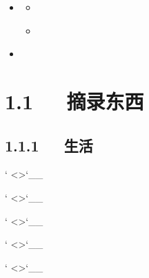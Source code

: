 \documentclass[letterpaper,12pt,english]{sphinxmanual}
\begin{document}
\begin{sphinxShadowBox}
\begin{itemize}
\begin{itemize}
\begin{itemize}
\end{itemize}

\item {} 
\label{\detokenize{000misc/extract:id17}}{\hyperref[\detokenize{000misc/extract:id5}]{}}
\begin{itemize}
\item {} 
\label{\detokenize{000misc/extract:id18}}{\hyperref[\detokenize{000misc/extract:swagger-swaggerrestful}]{}}

\item {} 
\label{\detokenize{000misc/extract:id19}}{\hyperref[\detokenize{000misc/extract:css-h2h3}]{}}

\end{itemize}

\item {} 
\label{\detokenize{000misc/extract:id20}}{\hyperref[\detokenize{000misc/extract:tmp-links}]{}}

\end{itemize}

\end{itemize}
\end{sphinxShadowBox}


\section{1.1   摘录东西}
\label{\detokenize{000misc/extract:id2}}

\subsection{1.1.1   生活}
\label{\detokenize{000misc/extract:id3}}


{}` \textless{}\textgreater{}{}`\_\_

{}` \textless{}\textgreater{}{}`\_\_

{}` \textless{}\textgreater{}{}`\_\_

{}` \textless{}\textgreater{}{}`\_\_

{}` \textless{}\textgreater{}{}`\_\_
\end{document}
